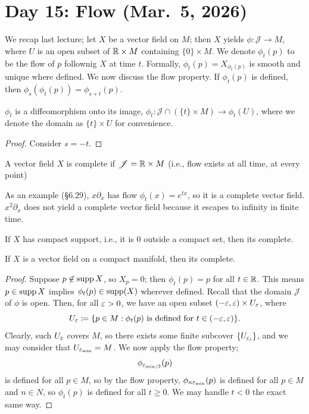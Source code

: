 \section{Day 15: Flow (Mar.\ 5, 2026)}
We recap last lecture; let $X$ be a vector field on $M$; then $X$ yields $\phi \colon \mathscr{J} \to M$, where $U$ is an open subset of $\mathbb R \times M$ containing $\{0\} \times M$. We denote $\phi_t(p)$ to be the flow of $p$ follownig $X$ at time $t$. Formally, $\phi_t(p) = X_{\phi_t(p)}$ is smooth and unique where defined. We now discuss the flow property. If $\phi_t(p)$ is defined, then $\phi_s(\phi_t(p)) = \phi_{s+t}(p)$.
\begin{corollary}
    $\phi_t$ is a diffeomorphism onto its image, $\phi_t \colon \mathscr J \cap (\{t\} \times M) \to \phi_t(U)$, where we denote the domain as $\{t\} \times U$ for convenience.
\end{corollary}
\begin{proof}
    Consider $s = -t$.
\end{proof}
\begin{definition}
    A vector field $X$ is complete if $\mathscr J = \mathbb R \times M$ (i.e., flow exists at all time, at every point)
\end{definition}
As an example (\S6.29), $x \partial_x$ has flow $\phi_t(x) = e^{tx}$, so it is a complete vector field. $x^2 \partial_x$ does not yield a complete vector field because it escapes to infinity in finite time.
\begin{theorem}[\S6.32]
    If $X$ has compact support, i.e., it is $0$ outside a compact set, then its complete.
\end{theorem}
\begin{corollary}
    If $X$ is a vector field on a compact manifold, then its complete.
\end{corollary}
\begin{proof}
    Suppose $p \not\in \operatorname{supp} X$, so $X_p = 0$; then $\phi_t(p) = p$ for all $t \in \mathbb R$. This means $p \in \operatorname{supp} X$ implies $\phi_t(p) \in \operatorname{supp}(X)$ wherever defined. Recall that the domain $\mathscr J$ of $\phi$ is open. Then, for all $\varepsilon > 0$, we have an open subset $(-\varepsilon, \varepsilon) \times U_\varepsilon$, where
    \[ U_\varepsilon \coloneq \{p \in M : \phi_t(p) \text{ is defined for } t \in (-\varepsilon, \varepsilon)\}. \]
    Clearly, such $U_\varepsilon$ covers $M$, so there exists some finite subcover $\{U_{\varepsilon_i}\}$, and we may consider that $U_{\varepsilon_\text{min}} = M$. We now apply the flow property;
    \[ \phi_{\varepsilon_{\text{min}/2}}(p) \]
    is defined for all $p \in M$, so by the flow property, $\phi_{n \varepsilon_{\text{min}}}(p)$ is defined for all $p \in M$ and $n \in N$, so $\phi_t(p)$ is defined for all $t \geq 0$. We may handle $t < 0$ the exact same way.
\end{proof}

